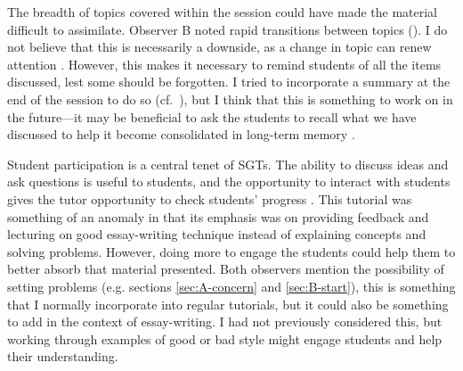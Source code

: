 The breadth of topics covered within the session could have made the material difficult to assimilate. Observer B noted rapid transitions between topics (). I do not believe that this is necessarily a downside, as a change in topic can renew attention \citep[chapter 2]{Brown1988}. However, this makes it necessary to remind students of all the items discussed, lest some should be forgotten. I tried to incorporate a summary at the end of the session to do so (cf.\ ), but I think that this is something to work on in the future---it may be beneficial to ask the students to recall what we have discussed to help it become consolidated in long-term memory \citep[chapter 2]{Brown1988}.

Student participation is a central tenet of SGTs. The ability to discuss ideas and ask questions is useful to students, and the opportunity to interact with students gives the tutor opportunity to check students' progress \citep[cf.][chapter 6]{Jaques2007}. This tutorial was something of an anomaly in that its emphasis was on providing feedback and lecturing on good essay-writing technique instead of explaining concepts and solving problems. However, doing more to engage the students could help them to better absorb that material presented. Both observers mention the possibility of setting problems (e.g. sections \ref{sec:A-concern} and \ref{sec:B-start}), this is something that I normally incorporate into regular tutorials, but it could also be something to add in the context of essay-writing. I had not previously considered this, but working through examples of good or bad style might engage students and help their understanding.

